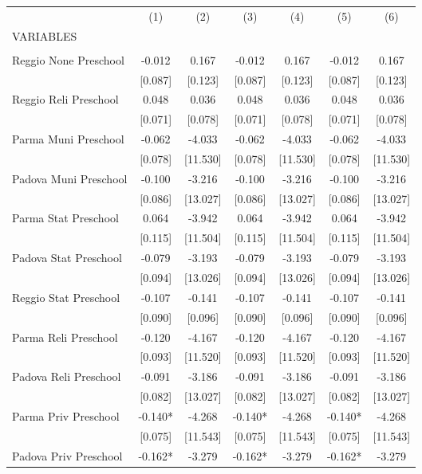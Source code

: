 \begin{tabular}{lcccccc} \hline
 & (1) & (2) & (3) & (4) & (5) & (6) \\
VARIABLES &  &  &  &  &  &  \\ \hline
 &  &  &  &  &  &  \\
Reggio None Preschool & -0.012 & 0.167 & -0.012 & 0.167 & -0.012 & 0.167 \\
 & [0.087] & [0.123] & [0.087] & [0.123] & [0.087] & [0.123] \\
Reggio Reli Preschool & 0.048 & 0.036 & 0.048 & 0.036 & 0.048 & 0.036 \\
 & [0.071] & [0.078] & [0.071] & [0.078] & [0.071] & [0.078] \\
Parma Muni Preschool & -0.062 & -4.033 & -0.062 & -4.033 & -0.062 & -4.033 \\
 & [0.078] & [11.530] & [0.078] & [11.530] & [0.078] & [11.530] \\
Padova Muni Preschool & -0.100 & -3.216 & -0.100 & -3.216 & -0.100 & -3.216 \\
 & [0.086] & [13.027] & [0.086] & [13.027] & [0.086] & [13.027] \\
Parma Stat Preschool & 0.064 & -3.942 & 0.064 & -3.942 & 0.064 & -3.942 \\
 & [0.115] & [11.504] & [0.115] & [11.504] & [0.115] & [11.504] \\
Padova Stat Preschool & -0.079 & -3.193 & -0.079 & -3.193 & -0.079 & -3.193 \\
 & [0.094] & [13.026] & [0.094] & [13.026] & [0.094] & [13.026] \\
Reggio Stat Preschool & -0.107 & -0.141 & -0.107 & -0.141 & -0.107 & -0.141 \\
 & [0.090] & [0.096] & [0.090] & [0.096] & [0.090] & [0.096] \\
Parma Reli Preschool & -0.120 & -4.167 & -0.120 & -4.167 & -0.120 & -4.167 \\
 & [0.093] & [11.520] & [0.093] & [11.520] & [0.093] & [11.520] \\
Padova Reli Preschool & -0.091 & -3.186 & -0.091 & -3.186 & -0.091 & -3.186 \\
 & [0.082] & [13.027] & [0.082] & [13.027] & [0.082] & [13.027] \\
Parma Priv Preschool & -0.140* & -4.268 & -0.140* & -4.268 & -0.140* & -4.268 \\
 & [0.075] & [11.543] & [0.075] & [11.543] & [0.075] & [11.543] \\
Padova Priv Preschool & -0.162* & -3.279 & -0.162* & -3.279 & -0.162* & -3.279 \\

\end{tabular}
